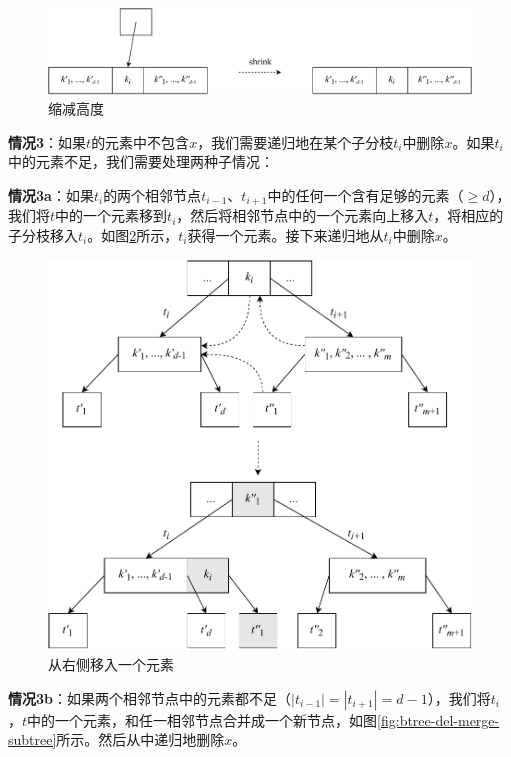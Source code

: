\documentclass[b5paper]{ctexart}
\begin{document}
\begin{figure}[htbp]
  \centering
  \includegraphics[scale=0.65]{img/btree-del-shrink}
  \caption{缩减高度}
  \label{fig:btree-del-shrink}
\end{figure}

\textbf{情况3}：如果$t$的元素中不包含$x$，我们需要递归地在某个子分枝$t_i$中删除$x$。如果$t_i$中的元素不足，我们需要处理两种子情况：

\textbf{情况3a}：如果$t_i$的两个相邻节点$t_{i-1}$、$t_{i+1}$中的任何一个含有足够的元素（$\geq d$），我们将$t$中的一个元素移到$t_i$，然后将相邻节点中的一个元素向上移入$t$，将相应的子分枝移入$t_i$。如图\ref{fig:btree-del-borrow}所示，$t_i$获得一个元素。接下来递归地从$t_i$中删除$x$。

\begin{figure}[htbp]
  \centering
  \includegraphics[scale=0.65]{img/btree-del-borrow}
  \caption{从右侧移入一个元素}
  \label{fig:btree-del-borrow}
\end{figure}

\textbf{情况3b}：如果两个相邻节点中的元素都不足（$|t_{i-1}| = |t_{i+1}| = d - 1$），我们将$t_i$，$t$中的一个元素，和任一相邻节点合并成一个新节点，如图\ref{fig:btree-del-merge-subtree}所示。然后从中递归地删除$x$。
\end{document}
